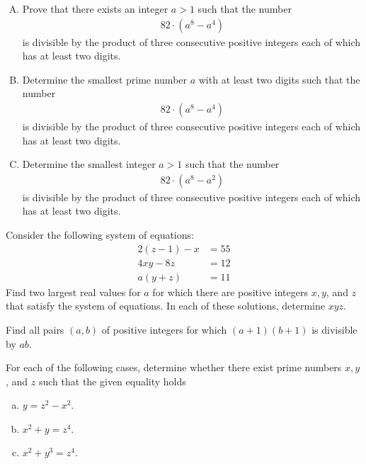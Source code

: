 \documentclass[problems.tex]{subfile}
\begin{document}
	\begin{problem} $ $
		\begin{enumerate}[(A)]
			\item Prove that there exists an integer $a>1$ such that the number
			\begin{align*}
				82 \cdot \left(a^8 - a^4\right)
			\end{align*}
			is divisible by the product of three consecutive positive integers each of which has at least two digits.
			\item Determine the smallest prime number $a$ with at least two digits such that the number
			\begin{align*}
				82 \cdot \left(a^8 - a^4\right)
			\end{align*}
			is divisible by the product of three consecutive positive integers each of which has at least two digits.
			\item Determine the smallest integer $a>1$ such that the number
			\begin{align*}
				82 \cdot \left(a^8 - a^2\right)
			\end{align*}
			is divisible by the product of three consecutive positive integers each of which has at least two digits.
		\end{enumerate}
	\end{problem}

	\begin{problem}
		Consider the following system of equations:
		\begin{align*}
			2(z-1) - x &= 55\\
			4xy - 8z   &= 12\\
			a(y+z)     &= 11
		\end{align*}
		Find two largest real values for $a$ for which there are positive integers $x, y$, and $z$ that satisfy the system of equations. In each of these solutions, determine $xyz$.
	\end{problem}

	\begin{problem}
		Find all pairs $(a, b)$ of positive integers for which $(a + 1) (b + 1)$ is divisible by $ab$.
	\end{problem}

	\begin{problem}
		For each of the following cases, determine whether there exist prime numbers $x,y$, and $z$ such that the given equality holds
		\begin{enumerate}[(a)]
			\item $y=z^2-x^2$.
			\item $x^2+y=z^4$.
			\item $x^2 +y^3 = z^4$.
		\end{enumerate}
	\end{problem}
\end{document}
